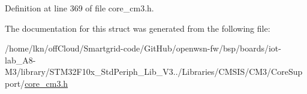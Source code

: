 Definition at line 369 of file core\+\_\+cm3.\+h.



The documentation for this struct was generated from the following file\+:\begin{DoxyCompactItemize}
\item 
/home/lkn/off\+Cloud/\+Smartgrid-\/code/\+Git\+Hub/openwsn-\/fw/bsp/boards/iot-\/lab\+\_\+\+A8-\/\+M3/library/\+S\+T\+M32\+F10x\+\_\+\+Std\+Periph\+\_\+\+Lib\+\_\+\+V3../\+Libraries/\+C\+M\+S\+I\+S/\+C\+M3/\+Core\+Support/\hyperlink{iot-lab___a8-_m3_2library_2_s_t_m32_f10x___std_periph___lib___v3_85_80_2_libraries_2_c_m_s_i_s_241d01c0ea18c1090ebeb06e5ef0ea5eb}{core\+\_\+cm3.\+h}\end{DoxyCompactItemize}
